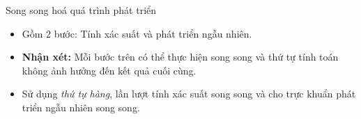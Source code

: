 \begin{frame}{Song song hoá quá trình phát triển}
\begin{itemize}
	\item Gồm 2 bước: Tính xác suất và phát triển ngẫu nhiên.
	\item \textbf{Nhận xét:} Mỗi bước trên có thể thực hiện song song và thứ tự tính toán không ảnh hưởng đến kết quả cuối cùng.
    \item Sử dụng \emph{thứ tự hàng}, lần lượt tính xác suất song song và cho trực khuẩn phát triển ngẫu nhiên song song.
\end{itemize}
\end{frame}